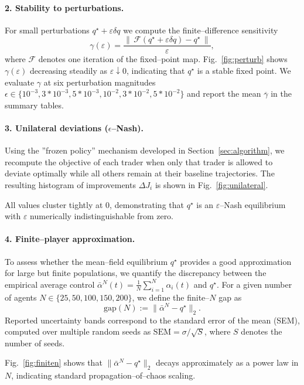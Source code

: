 \documentclass[11pt]{article}
\theoremstyle{definition}
\begin{document}
\paragraph*{2. Stability to perturbations.}
For small perturbations $q^\star + \varepsilon \delta q$ we compute the 
finite--difference sensitivity
\[
\gamma(\varepsilon)
=
\frac{\|\,\mathcal{F}(q^\star+\varepsilon \delta q) - q^\star\,\|}
{\varepsilon},
\]
where $\mathcal{F}$ denotes one iteration of the fixed--point map.
Fig.~\ref{fig:perturb} shows $\gamma(\varepsilon)$ decreasing steadily as 
$\varepsilon\downarrow 0$, indicating that $q^\star$ is a stable fixed point. We evaluate $\gamma$ at six perturbation magnitudes $\epsilon\in\{10^{-3}, 3*10^{-3}, 5*10^{-3}, 10^{-2}, 3*10^{-2}, 5*10^{-2}\}$ and report the mean $\overline{\gamma}$ in the summary tables.

\paragraph*{3. Unilateral deviations ($\epsilon$--Nash).}
Using the ''frozen policy'' mechanism developed in Section~\ref{sec:algorithm}, 
we recompute the objective of each trader when only that trader is allowed  to deviate optimally while all others remain at their baseline trajectories. The resulting histogram of improvements $\Delta J_i$ is shown in Fig.~\ref{fig:unilateral}.

All values cluster tightly at $0$, demonstrating that $q^\star$ is an 
$\varepsilon$--Nash equilibrium with $\varepsilon$ numerically indistinguishable from zero. 

\paragraph*{4. Finite--player approximation.}
To assess whether the mean--field equilibrium $q^\star$ provides a good approximation for large but finite populations, we quantify the discrepancy between the empirical average control 
\(
\bar\alpha^N(t) = \frac1N \sum_{i=1}^N \alpha_i(t)
\)
and $q^\star$. For a given number of agents $N\in\{25, 50, 100, 150, 200\}$, we define the finite--$N$ gap as
\[
\mathrm{gap}(N) := \|\bar{\alpha}^N - q^\star\|_2.
\]
Reported uncertainty bands correspond to the standard error of the mean (SEM), computed over multiple random seeds as $\mathrm{SEM} = \sigma / \sqrt{S}$, where $S$ denotes the number of seeds.

Fig.~\ref{fig:finiten} shows that $\|\bar\alpha^N - q^\star\|_2$ decays approximately as a power law in $N$, indicating standard propagation--of--chaos scaling.
\end{document}
